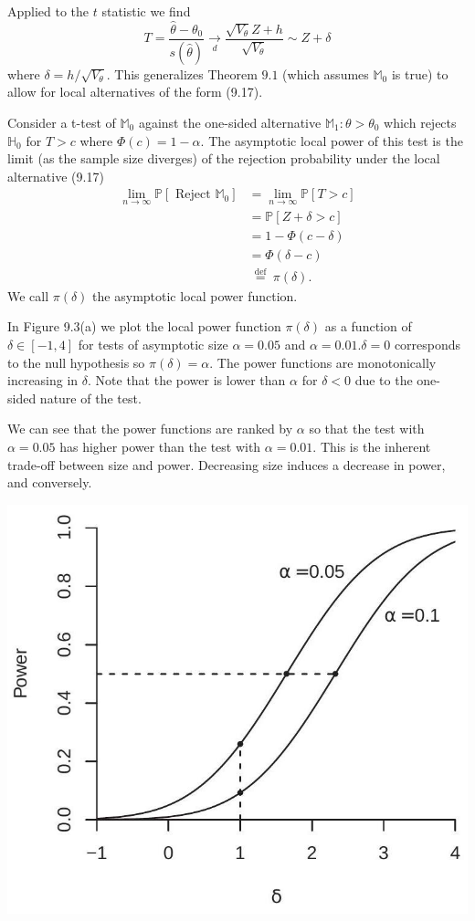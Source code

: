 \documentclass[10pt]{article}
\begin{document}
Applied to the $t$ statistic we find
$$
T=\frac{\widehat{\theta}-\theta_{0}}{s(\widehat{\theta})} \underset{d}{\longrightarrow} \frac{\sqrt{V_{\theta}} Z+h}{\sqrt{V_{\theta}}} \sim Z+\delta
$$
where $\delta=h / \sqrt{V_{\theta}}$. This generalizes Theorem $9.1$ (which assumes $\mathbb{M}_{0}$ is true) to allow for local alternatives of the form (9.17).

Consider a t-test of $\mathbb{M}_{0}$ against the one-sided alternative $\mathbb{M}_{1}: \theta>\theta_{0}$ which rejects $\mathbb{H}_{0}$ for $T>c$ where $\Phi(c)=1-\alpha$. The asymptotic local power of this test is the limit (as the sample size diverges) of the rejection probability under the local alternative (9.17)
$$
\begin{aligned}
\lim _{n \rightarrow \infty} \mathbb{P}\left[\text { Reject } \mathbb{M}_{0}\right] &=\lim _{n \rightarrow \infty} \mathbb{P}[T>c] \\
&=\mathbb{P}[Z+\delta>c] \\
&=1-\Phi(c-\delta) \\
&=\Phi(\delta-c) \\
& \stackrel{\text { def }}{=} \pi(\delta) .
\end{aligned}
$$
We call $\pi(\delta)$ the asymptotic local power function.

In Figure 9.3(a) we plot the local power function $\pi(\delta)$ as a function of $\delta \in[-1,4]$ for tests of asymptotic size $\alpha=0.05$ and $\alpha=0.01 . \delta=0$ corresponds to the null hypothesis so $\pi(\delta)=\alpha$. The power functions are monotonically increasing in $\delta$. Note that the power is lower than $\alpha$ for $\delta<0$ due to the one-sided nature of the test.

We can see that the power functions are ranked by $\alpha$ so that the test with $\alpha=0.05$ has higher power than the test with $\alpha=0.01$. This is the inherent trade-off between size and power. Decreasing size induces a decrease in power, and conversely.

\includegraphics[max width=\textwidth]{2022_09_17_d22774979aa7978900adg-28}
\end{document}
